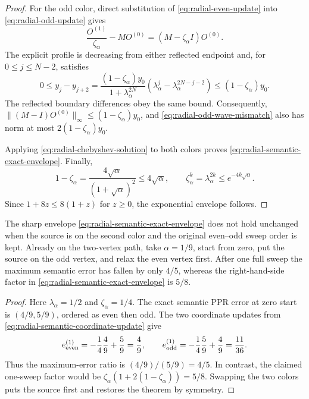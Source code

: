 \begin{proof}
For the odd color, direct substitution of
\eqref{eq:radial-even-update} into
\eqref{eq:radial-odd-update} gives
\begin{equation}
 \frac{O^{(1)}}{\zeta_\alpha}-MO^{(0)}
 =(M-\zeta_\alpha I)O^{(0)}.
 \label{eq:radial-odd-wave-mismatch}
\end{equation}
The explicit profile is decreasing from either reflected endpoint and, for
$0\leq j\leq N-2$, satisfies
\begin{equation}
 0\leq y_j-y_{j+2}
 =\frac{(1-\zeta_\alpha)y_0}
        {1+\lambda_\alpha^{2N}}
   \left(
    \lambda_\alpha^j
    -\lambda_\alpha^{2N-j-2}
   \right)
 \leq(1-\zeta_\alpha)y_0.
 \label{eq:radial-profile-two-step-difference}
\end{equation}
The reflected boundary differences obey the same bound.  Consequently,
$\|(M-I)O^{(0)}\|_\infty\leq
(1-\zeta_\alpha)y_0$, and
\eqref{eq:radial-odd-wave-mismatch} also has norm at most
$2(1-\zeta_\alpha)y_0$.

Applying \eqref{eq:radial-chebyshev-solution} to both colors proves
\eqref{eq:radial-semantic-exact-envelope}.  Finally,
\begin{equation*}
 1-\zeta_\alpha
 =\frac{4\sqrt\alpha}{(1+\sqrt\alpha)^2}
 \leq4\sqrt\alpha,
 \qquad
 \zeta_\alpha^k=\lambda_\alpha^{2k}
 \leq e^{-4k\sqrt\alpha}.
\end{equation*}
Since $1+8z\leq8(1+z)$ for $z\geq0$, the exponential envelope follows.
\end{proof}

\begin{proposition}
\label{prop:radial-sweep-order-witness}
The sharp envelope
\eqref{eq:radial-semantic-exact-envelope} does not hold unchanged when the
source is on the second color and the original even--odd sweep order is kept.
Already on the two-vertex path, take $\alpha=1/9$, start from zero, put the
source on the odd vertex, and relax the even vertex first.  After one full
sweep the maximum semantic error has fallen by only $4/5$, whereas the
right-hand-side factor in
\eqref{eq:radial-semantic-exact-envelope} is $5/8$.
\end{proposition}

\begin{proof}
Here $\lambda_\alpha=1/2$ and $\zeta_\alpha=1/4$.  The exact semantic PPR
error at zero start is $(4/9,5/9)$, ordered as even then odd.  The two
coordinate updates from
\eqref{eq:radial-semantic-coordinate-update} give
\begin{equation*}
 e_{\rm even}^{(1)}
 =-\frac14\frac49+\frac59=\frac49,
 \qquad
 e_{\rm odd}^{(1)}
 =-\frac14\frac59+\frac49=\frac{11}{36}.
\end{equation*}
Thus the maximum-error ratio is $(4/9)/(5/9)=4/5$.  In contrast, the claimed
one-sweep factor would be
$\zeta_\alpha(1+2(1-\zeta_\alpha))=5/8$.  Swapping the two colors puts the
source first and restores the theorem by symmetry.
\end{proof}

